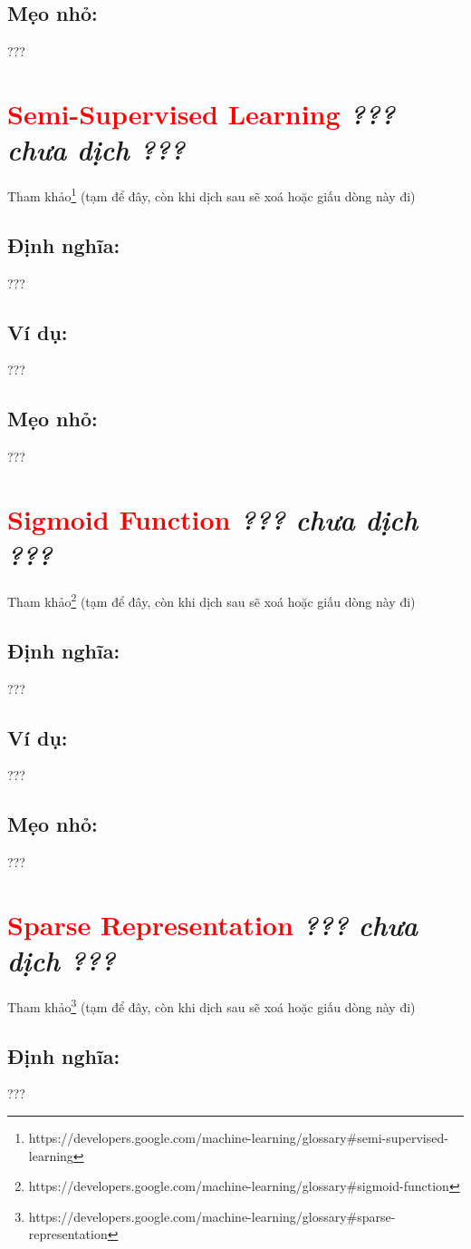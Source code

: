 \subsection*{Mẹo nhỏ:}
???
\section*{\huge \textcolor{Red}{Semi-Supervised Learning}  \small \textit{??? chưa dịch ???} }
Tham khảo\footnote{https://developers.google.com/machine-learning/glossary\#semi-supervised-learning} (tạm để đây, còn khi dịch sau sẽ xoá hoặc giấu dòng này đi)
\subsection*{Định nghĩa:}
???
\subsection*{Ví dụ:}
???
\subsection*{Mẹo nhỏ:}
???
\section*{\huge \textcolor{Red}{Sigmoid Function}  \small \textit{??? chưa dịch ???} }
Tham khảo\footnote{https://developers.google.com/machine-learning/glossary\#sigmoid-function} (tạm để đây, còn khi dịch sau sẽ xoá hoặc giấu dòng này đi)
\subsection*{Định nghĩa:}
???
\subsection*{Ví dụ:}
???
\subsection*{Mẹo nhỏ:}
???
\section*{\huge \textcolor{Red}{Sparse Representation}  \small \textit{??? chưa dịch ???} }
Tham khảo\footnote{https://developers.google.com/machine-learning/glossary\#sparse-representation} (tạm để đây, còn khi dịch sau sẽ xoá hoặc giấu dòng này đi)
\subsection*{Định nghĩa:}
???
